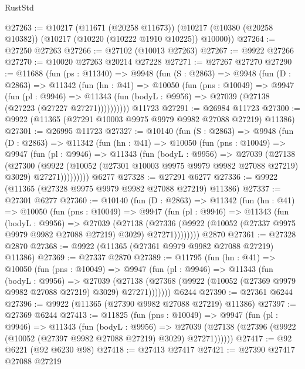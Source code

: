 \begin{lexlean}{RustStd}
\begin{coremodule}
@27263 := @10217
    (@11671 (@20258 @11673))
    (@10217 (@10380 (@20258 @10382)) (@10217 (@10220 (@10222 @1910 @10225)) @10000))
@27264 := @27250 @27263
@27266 := @27102 (@10013 @27263)
@27267 := @9922 @27266
@27270 := @10020 @27263 @20214 @27228
@27271 := @27267 @27270
@27290 := @11688
    (fun (ps : @11340) =>
    @9948
      (fun (S : @2863) =>
      @9948
        (fun (D : @2863) =>
        @11342
          (fun (hn : @41) =>
          @10050
            (fun (pns : @10049) =>
            @9947
              (fun (pl : @9946) =>
              @11343 (fun (bodyL : @9956) => @27039 (@27138 (@27223 (@27227 @27271))))))))))
    @11723
@27291 := @26984 @11723
@27300 := @9922 (@11365 (@27291 @10003 @9975 @9979 @9982 @27088 @27219) @11386)
@27301 := @26995 @11723
@27327 := @10140
    (fun (S : @2863) =>
    @9948
      (fun (D : @2863) =>
      @11342
        (fun (hn : @41) =>
        @10050
          (fun (pns : @10049) =>
          @9947
            (fun (pl : @9946) =>
            @11343
              (fun (bodyL : @9956) =>
              @27039
                (@27138
                  (@27300
                    (@9922
                      (@10052 (@27301 @10003 @9975 @9979 @9982 @27088 @27219) @3029)
                      @27271)))))))))
    @6277
@27328 := @27291 @6277
@27336 := @9922 (@11365 (@27328 @9975 @9979 @9982 @27088 @27219) @11386)
@27337 := @27301 @6277
@27360 := @10140
    (fun (D : @2863) =>
    @11342
      (fun (hn : @41) =>
      @10050
        (fun (pns : @10049) =>
        @9947
          (fun (pl : @9946) =>
          @11343
            (fun (bodyL : @9956) =>
            @27039
              (@27138
                (@27336
                  (@9922 (@10052 (@27337 @9975 @9979 @9982 @27088 @27219) @3029) @27271))))))))
    @2870
@27361 := @27328 @2870
@27368 := @9922 (@11365 (@27361 @9979 @9982 @27088 @27219) @11386)
@27369 := @27337 @2870
@27389 := @11795
    (fun (hn : @41) =>
    @10050
      (fun (pns : @10049) =>
      @9947
        (fun (pl : @9946) =>
        @11343
          (fun (bodyL : @9956) =>
          @27039
            (@27138 (@27368 (@9922 (@10052 (@27369 @9979 @9982 @27088 @27219) @3029) @27271)))))))
    @6244
@27390 := @27361 @6244
@27396 := @9922 (@11365 (@27390 @9982 @27088 @27219) @11386)
@27397 := @27369 @6244
@27413 := @11825
    (fun (pns : @10049) =>
    @9947
      (fun (pl : @9946) =>
      @11343
        (fun (bodyL : @9956) =>
        @27039 (@27138 (@27396 (@9922 (@10052 (@27397 @9982 @27088 @27219) @3029) @27271))))))
@27417 := @92 @6221 (@92 @6230 @98)
@27418 := @27413 @27417
@27421 := @27390 @27417 @27088 @27219

\end{coremodule}
\end{lexlean}
